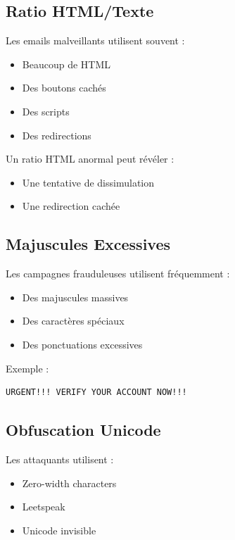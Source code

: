 \documentclass[12pt,a4paper]{article}
\begin{document}
\subsection{Ratio HTML/Texte}

Les emails malveillants utilisent souvent :
\begin{itemize}
    \item Beaucoup de HTML
    \item Des boutons cachés
    \item Des scripts
    \item Des redirections
\end{itemize}

Un ratio HTML anormal peut révéler :
\begin{itemize}
    \item Une tentative de dissimulation
    \item Une redirection cachée
\end{itemize}

\subsection{Majuscules Excessives}

Les campagnes frauduleuses utilisent fréquemment :
\begin{itemize}
    \item Des majuscules massives
    \item Des caractères spéciaux
    \item Des ponctuations excessives
\end{itemize}

Exemple :
\begin{verbatim}
URGENT!!! VERIFY YOUR ACCOUNT NOW!!!
\end{verbatim}

\subsection{Obfuscation Unicode}

Les attaquants utilisent :
\begin{itemize}
    \item Zero-width characters
    \item Leetspeak
    \item Unicode invisible
\end{itemize}
\end{document}
